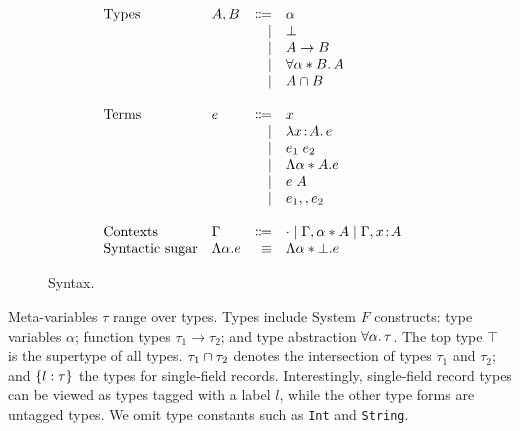 \begin{figure}
  \[
    \begin{array}{l}
      \begin{array}{llrll}
        \text{Types}
        & A, B & \Coloneqq & \alpha                  & \\
        &      & \mid & \bot                         & \\
        &      & \mid & A \to B                      & \\
        &      & \mid & \forall \alpha * B. \, A  & \\
        &      & \mid & A \cap B               & \\

        \\
        \text{Terms}
        & e & \Coloneqq & x                        & \\
        &   & \mid & \lambda x \!:\! A.\, e                    & \\
        &   & \mid & e_1 \; e_2              & \\
        &   & \mid & \Lambda \alpha * A. e  & \\
        &   & \mid & e \; A                     & \\
        &   & \mid & e_1 ,, e_2              & \\

        \\
        \text{Contexts}
        & \Gamma & \Coloneqq & \cdot
                   \mid \Gamma, \alpha * A
                   \mid \Gamma, x \!:\! A  & \\

        \text{Syntactic sugar} & \Lambda \alpha. e & \equiv & \Lambda \alpha * \bot. e & \\
      \end{array}
    \end{array}
  \]

  \caption{Syntax.}
  \label{fig:fi-syntax}
\end{figure}


Meta-variables $\tau$ range over types. Types include System $F$ constructs:
type variables $\alpha$; function types $\tau_1 \to \tau_2$; and type
abstraction $ \forall \alpha. \, \tau $. The top type $\top$ is the supertype of all
types. $\tau_1 \cap \tau_2$ denotes
the intersection of types $\tau_1$ and $\tau_2$; and $\{ l : \tau \}$ the types
for single-field records. Interestingly, single-field record types can be viewed as types
tagged with a label $l$, while the other type forms are untagged types. We omit
type constants such as \lstinline$Int$ and \lstinline$String$.

